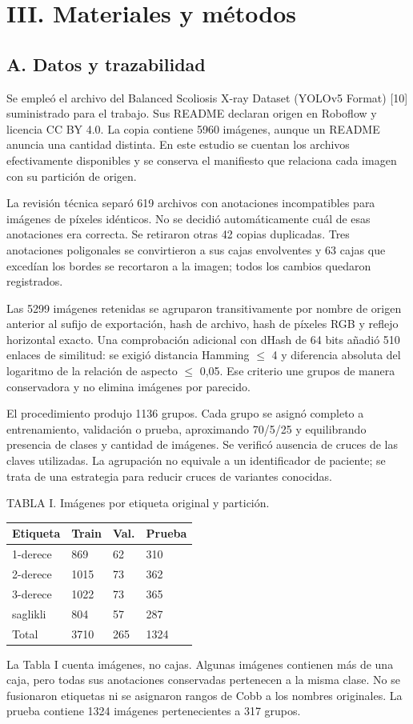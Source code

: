 \documentclass[conference]{IEEEtran}
\begin{document}
\newpage
\section*{III. Materiales y métodos}
\subsection*{A. Datos y trazabilidad}
Se empleó el archivo del Balanced Scoliosis X-ray Dataset (YOLOv5 Format) [10] suministrado para el trabajo. Sus README declaran origen en Roboflow y licencia CC BY 4.0. La copia contiene 5960 imágenes, aunque un README anuncia una cantidad distinta. En este estudio se cuentan los archivos efectivamente disponibles y se conserva el manifiesto que relaciona cada imagen con su partición de origen.

La revisión técnica separó 619 archivos con anotaciones incompatibles para imágenes de píxeles idénticos. No se decidió automáticamente cuál de esas anotaciones era correcta. Se retiraron otras 42 copias duplicadas. Tres anotaciones poligonales se convirtieron a sus cajas envolventes y 63 cajas que excedían los bordes se recortaron a la imagen; todos los cambios quedaron registrados.

Las 5299 imágenes retenidas se agruparon transitivamente por nombre de origen anterior al sufijo de exportación, hash de archivo, hash de píxeles RGB y reflejo horizontal exacto. Una comprobación adicional con dHash de 64 bits añadió 510 enlaces de similitud: se exigió distancia Hamming $\leq$ 4 y diferencia absoluta del logaritmo de la relación de aspecto $\leq$ 0,05. Ese criterio une grupos de manera conservadora y no elimina imágenes por parecido.

El procedimiento produjo 1136 grupos. Cada grupo se asignó completo a entrenamiento, validación o prueba, aproximando 70/5/25 y equilibrando presencia de clases y cantidad de imágenes. Se verificó ausencia de cruces de las claves utilizadas. La agrupación no equivale a un identificador de paciente; se trata de una estrategia para reducir cruces de variantes conocidas.

\begin{center}\small
TABLA I. Imágenes por etiqueta original y partición.\par\medskip
\begin{tabular}{llll}
\toprule
Etiqueta & Train & Val. & Prueba\\\midrule
1-derece & 869 & 62 & 310\\
2-derece & 1015 & 73 & 362\\
3-derece & 1022 & 73 & 365\\
saglikli & 804 & 57 & 287\\
Total & 3710 & 265 & 1324\\
\bottomrule\end{tabular}\end{center}
La Tabla I cuenta imágenes, no cajas. Algunas imágenes contienen más de una caja, pero todas sus anotaciones conservadas pertenecen a la misma clase. No se fusionaron etiquetas ni se asignaron rangos de Cobb a los nombres originales. La prueba contiene 1324 imágenes pertenecientes a 317 grupos.
\end{document}
